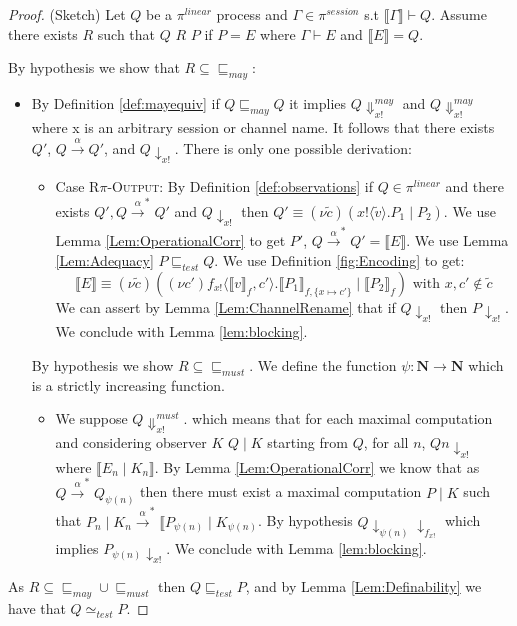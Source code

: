 \begin{proof}
(Sketch) Let $Q$ be a $\pi^{linear}$ process and $\Gamma \in \pi^{session}$ s.t $\llbracket \Gamma \rrbracket \vdash Q$. Assume there exists $R$ such that $Q$ $R$ $P$ if $P = E$ where $\Gamma \vdash E$ and $\llbracket E \rrbracket = Q$. 

By hypothesis we show that $R \subseteq \sqsubseteq_{may}$:
\begin{itemize}
    \item By Definition \ref{def:mayequiv} if $Q \sqsubseteq_{may} Q$ it implies $Q \Downarrow^{may}_{x!}$ and $Q \Downarrow^{may}_{x!}$ where x is an arbitrary session or channel name. It follows that there exists $Q'$, $Q \xrightarrow{\alpha} Q'$, and $Q \downarrow_{x!}$. There is only one possible derivation:
    \begin{itemize}
        \item Case \textsc{R$\pi$-Output}: By Definition \ref{def:observations} if $Q \in \pi^{linear}$ and there exists $Q', Q \xrightarrow{\alpha}^* Q'$ and $Q \downarrow_{x!}$ then $Q' \equiv (\nu \widetilde{c})(x!\langle \widetilde{v} \rangle.P_1 \mid P_2)$. We use Lemma \ref{Lem:OperationalCorr} to get $P'$, $Q \xrightarrow{\alpha}^* Q' = \llbracket E \rrbracket$. We use Lemma \ref{Lem:Adequacy} $P \sqsubseteq_{test} Q$. We use Definition \ref{fig:Encoding} to get:
        \begin{equation*}
            \llbracket E \rrbracket \equiv (\nu \widetilde{c})((\nu c')f_{x!}\langle \llbracket v \rrbracket_f, c' \rangle.\llbracket P_1 \rrbracket_{f, \{x \mapsto c' \}} \mid \llbracket P_2 \rrbracket_f ) \text{ with } x, c' \not \in \widetilde{c}
        \end{equation*}
        We can assert by Lemma \ref{Lem:ChannelRename} that if $Q \downarrow_{x!}$ then $P \downarrow_{x!}$. We conclude with Lemma \ref{lem:blocking}.
    \end{itemize}
    By hypothesis we show $R \subseteq \sqsubseteq_{must}$. We define the function $\psi : \mathbf{N} \rightarrow \mathbf{N}$ which is a strictly increasing function.
    \begin{itemize}
        \item We suppose $Q \Downarrow^{must}_{x!}$. which means that for each maximal computation and considering observer $K$ $Q \mid K$ starting from $Q$, for all $n$, $Qn \downarrow_{x!}$ where $\llbracket E_n \mid K_n \rrbracket$. By Lemma \ref{Lem:OperationalCorr} we know that as $Q \xrightarrow{\alpha}^* Q_{\psi(n)}$ then there must exist a maximal computation $P \mid K$ such that $P_n \mid K_n \xrightarrow{\alpha}^* \llbracket P_{\psi(n)} \mid K_{\psi(n)}$. By hypothesis $Q \downarrow_{\psi(n)} \downarrow_{f_{x!}}$ which implies $P_{\psi(n)} \downarrow_{x!}$. We conclude with Lemma \ref{lem:blocking}. 
    \end{itemize}
\end{itemize}

As $R \subseteq \sqsubseteq_{may} \cup \sqsubseteq_{must}$ then $Q \sqsubseteq_{test} P$, and by Lemma \ref{Lem:Definability} we have that $Q \simeq_{test} P$.
\end{proof}

